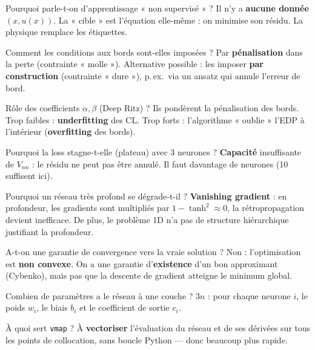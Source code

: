 \documentclass[11pt]{article}
\newcommand{\key}[1]{\textbf{#1}}
\begin{document}
\begin{qbox}{Pourquoi parle-t-on d'apprentissage « non supervisé » ?}
Il n'y a \key{aucune donnée} $(x,u(x))$. La « cible » est l'équation elle-même :
on minimise son résidu. La physique remplace les étiquettes.
\end{qbox}

\begin{qbox}{Comment les conditions aux bords sont-elles imposées ?}
Par \key{pénalisation} dans la perte (contrainte « molle »). Alternative possible :
les imposer \key{par construction} (contrainte « dure »), p.\,ex.\ via un ansatz
qui annule l'erreur de bord.
\end{qbox}

\begin{qbox}{Rôle des coefficients $\alpha,\beta$ (Deep Ritz) ?}
Ils pondèrent la pénalisation des bords. Trop faibles : \key{underfitting} des CL.
Trop forts : l'algorithme « oublie » l'EDP à l'intérieur (\key{overfitting} des bords).
\end{qbox}

\begin{qbox}{Pourquoi la loss stagne-t-elle (plateau) avec 3 neurones ?}
\key{Capacité} insuffisante de $V_{nn}$ : le résidu ne peut pas être annulé.
Il faut davantage de neurones (10 suffisent ici).
\end{qbox}

\begin{qbox}{Pourquoi un réseau très profond se dégrade-t-il ?}
\key{Vanishing gradient} : en profondeur, les gradients sont multipliés par
$1-\tanh^2\!\approx 0$, la rétropropagation devient inefficace. De plus, le
problème 1D n'a pas de structure hiérarchique justifiant la profondeur.
\end{qbox}

\begin{qbox}{A-t-on une garantie de convergence vers la vraie solution ?}
Non : l'optimisation est \key{non convexe}. On a une garantie d'\key{existence}
d'un bon approximant (Cybenko), mais pas que la descente de gradient atteigne le
minimum global.
\end{qbox}

\begin{qbox}{Combien de paramètres a le réseau à une couche ?}
$3n$ : pour chaque neurone $i$, le poids $w_i$, le biais $b_i$ et le coefficient de
sortie $c_i$.
\end{qbox}

\begin{qbox}{À quoi sert \texttt{vmap} ?}
À \key{vectoriser} l'évaluation du réseau et de ses dérivées sur tous les points de
collocation, sans boucle Python — donc beaucoup plus rapide.
\end{qbox}
\end{document}
